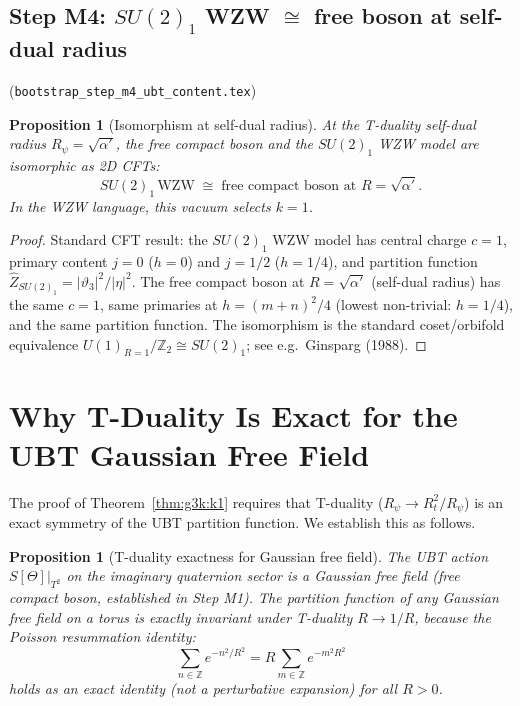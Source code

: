 \documentclass[12pt,a4paper]{article}
\newtheorem{proposition}[theorem]{Proposition}
\theoremstyle{definition}
\theoremstyle{remark}
\begin{document}
\subsection*{Step M4: $SU(2)_1$ WZW $\cong$ free boson at self-dual radius}
(\texttt{bootstrap\_step\_m4\_ubt\_content.tex})

\begin{proposition}[Isomorphism at self-dual radius]
\label{prop:g3k:su2_1_iso}
At the T-duality self-dual radius $R_\psi = \sqrt{\alpha'}$, the free compact
boson and the $SU(2)_1$ WZW model are isomorphic as 2D CFTs:
\begin{equation}
  SU(2)_1\,\text{WZW} \;\cong\; \text{free compact boson at } R = \sqrt{\alpha'}.
  \label{eq:g3k:su2_1_iso}
\end{equation}
In the WZW language, this vacuum selects $k = 1$.
\end{proposition}

\begin{proof}
Standard CFT result: the $SU(2)_1$ WZW model has central charge $c = 1$,
primary content $j = 0$ ($h=0$) and $j=1/2$ ($h=1/4$), and partition function
$\hat{Z}_{SU(2)_1} = |\vartheta_3|^2/|\eta|^2$.  The free compact boson at
$R = \sqrt{\alpha'}$ (self-dual radius) has the same $c = 1$, same primaries
at $h = (m+n)^2/4$ (lowest non-trivial: $h = 1/4$), and the same partition
function.  The isomorphism is the standard coset/orbifold equivalence
$U(1)_{R=1}/\mathbb{Z}_2 \cong SU(2)_1$; see e.g.\ Ginsparg (1988).
\end{proof}

\section{Why T-Duality Is Exact for the UBT Gaussian Free Field}
\label{sec:g3k:condition}

The proof of Theorem~\ref{thm:g3k:k1} requires that T-duality ($R_\psi \to R_t^2/R_\psi$)
is an exact symmetry of the UBT partition function.  We establish this as follows.

\begin{proposition}[T-duality exactness for Gaussian free field]
\label{prop:g3k:tdual_exact}
The UBT action $S[\Theta]|_{T^2}$ on the imaginary quaternion sector is a
Gaussian free field (free compact boson, established in Step M1).
The partition function of any Gaussian free field on a torus is exactly
invariant under T-duality $R \to 1/R$, because the Poisson resummation identity:
\begin{equation}
  \sum_{n \in \mathbb{Z}} e^{-n^2/R^2}
  = R \sum_{m \in \mathbb{Z}} e^{-m^2 R^2}
  \label{eq:g3k:poisson}
\end{equation}
holds as an exact identity (not a perturbative expansion) for all $R > 0$.
\end{proposition}
\end{document}
